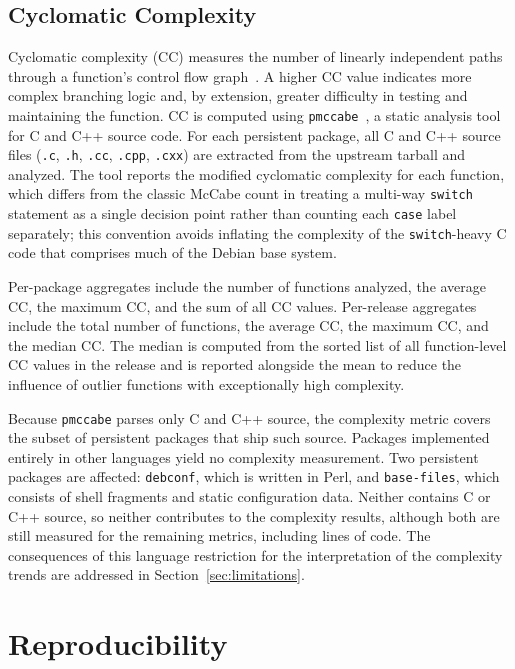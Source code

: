 \subsection{Cyclomatic Complexity}
\label{sec:metric-cc}

Cyclomatic complexity (CC) measures the number of linearly independent paths through a function's control flow graph~\cite{CyclomaticComplexity}. A higher CC value indicates more complex branching logic and, by extension, greater difficulty in testing and maintaining the function. CC is computed using \texttt{pmccabe}~\cite{pmccabe}, a static analysis tool for C and C++ source code. For each persistent package, all C and C++ source files (\texttt{.c}, \texttt{.h}, \texttt{.cc}, \texttt{.cpp}, \texttt{.cxx}) are extracted from the upstream tarball and analyzed. The tool reports the modified cyclomatic complexity for each function, which differs from the classic McCabe count in treating a multi-way \texttt{switch} statement as a single decision point rather than counting each \texttt{case} label separately; this convention avoids inflating the complexity of the \texttt{switch}-heavy C code that comprises much of the Debian base system.

Per-package aggregates include the number of functions analyzed, the average CC, the maximum CC, and the sum of all CC values. Per-release aggregates include the total number of functions, the average CC, the maximum CC, and the median CC. The median is computed from the sorted list of all function-level CC values in the release and is reported alongside the mean to reduce the influence of outlier functions with exceptionally high complexity.

Because \texttt{pmccabe} parses only C and C++ source, the complexity metric covers the subset of persistent packages that ship such source. Packages implemented entirely in other languages yield no complexity measurement. Two persistent packages are affected: \texttt{debconf}, which is written in Perl, and \texttt{base-files}, which consists of shell fragments and static configuration data. Neither contains C or C++ source, so neither contributes to the complexity results, although both are still measured for the remaining metrics, including lines of code. The consequences of this language restriction for the interpretation of the complexity trends are addressed in Section~\ref{sec:limitations}.

\section{Reproducibility}
\label{sec:reproducibility}

